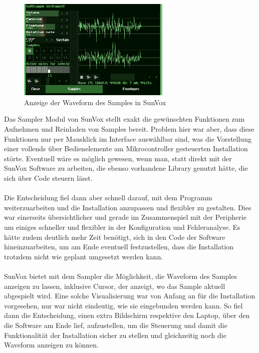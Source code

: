\documentclass[12pt]{scrartcl}%
\theoremstyle{nonumberplain}
\begin{document}
\begin{figure}
  \centering
  \includegraphics[width=0.65\textwidth]{sunvox_4}
  \caption{Anzeige der Waveform des Samples in SunVox}
\end{figure}

\noindent Das Sampler Modul von SunVox stellt exakt die gewünschten Funktionen zum Aufnehmen und Reinladen von Samples bereit. Problem hier war aber, dass diese Funktionen nur per Mausklick im Interface auswählbar sind, was die Vorstellung einer vollends über Bedienelemente am Mikrocontroller gesteuerten Installation störte. Eventuell wäre es möglich gewesen, wenn man, statt direkt mit der SunVox Software zu arbeiten, die ebenso vorhandene Library genutzt hätte, die sich über Code steuern lässt.
\\\\
Die Entscheidung fiel dann aber schnell darauf, mit dem Programm weiterzuarbeiten und die Installation anzupassen und flexibler zu gestalten. Dies war einerseits übersichtlicher und gerade im Zusammenspiel mit der Peripherie um einiges schneller und flexibler in der Konfiguration und Fehleranalyse. Es hätte zudem deutlich mehr Zeit benötigt, sich in den Code der Software hineinzuarbeiten, um am Ende eventuell festzustellen, dass die Installation trotzdem nicht wie geplant umgesetzt werden kann.
\\\\
SunVox bietet mit dem Sampler die Möglichkeit, die Waveform des Samples anzeigen zu lassen, inklusive Cursor, der anzeigt, wo das Sample aktuell abgespielt wird. Eine solche Visualisierung war von Anfang an für die Installation vorgesehen, nur war nicht eindeutig, wie sie eingebunden werden kann. So fiel dann die Entscheidung, einen extra Bildschirm respektive den Laptop, über den die Software am Ende lief, aufzustellen, um die Steuerung und damit die Funktionalität der Installation sicher zu stellen und gleichzeitig noch die Waveform anzeigen zu können.\\
\end{document}
